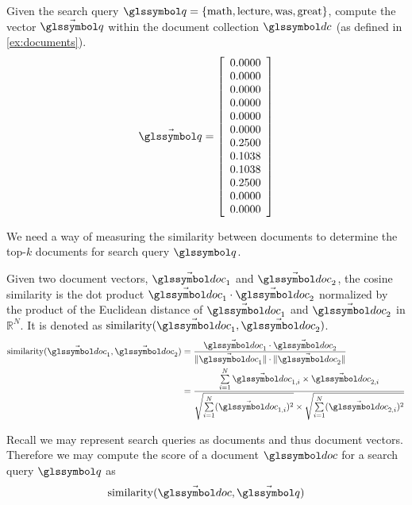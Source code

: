 		\begin{ex}
			\label{ex:query}
			Given the search query \(\q = \{\text{math}, \text{lecture}, \text{was}, \text{great}\}\), compute the vector \(\vec{\q}\) within the document collection \(\dc\) (as defined in \cref{ex:documents}).
			\[
				\vec{\q} = 
					\left[
						\begin{array}{c}
							0.0000 \\
							0.0000 \\
							0.0000 \\
							0.0000 \\
							0.0000 \\
							0.0000 \\
							0.2500 \\
							0.1038 \\
							0.1038 \\
							0.2500 \\
							0.0000 \\
							0.0000 \\
						\end{array}
					\right]
			\]
		\end{ex}
		
		We need a way of measuring the similarity between documents to determine the top-\(k\) documents for search query \(\q\).
		
		\begin{defn}
			Given two document vectors, \(\vec{\doc}_1\) and \(\vec{\doc}_2\), the cosine similarity is the dot product \(\vec{\doc}_1 \cdot \vec{\doc}_2\) normalized by the product of the Euclidean distance of \(\vec{\doc}_1\) and \(\vec{\doc}_2\) in \(\mathbb{R}^N\).	It is denoted as \(\similarity(\vec{\doc}_1, \vec{\doc}_2)\).
			\begin{align}
				\similarity(\vec{\doc}_1, \vec{\doc}_2) &= \frac{\vec{\doc}_1 \cdot \vec{\doc}_2}{\norm{\vec{\doc}_1} \cdot \norm{\vec{\doc}_2}} \\
				 &= \frac{\sum\limits_{i=1}^{N} \vec{\doc}_{1, i} \times \vec{\doc}_{2, i}}{\sqrt{\sum\limits_{i=1}^{N} (\vec{\doc}_{1, i})^2} \times \sqrt{\sum\limits_{i=1}^{N} (\vec{\doc}_{2, i})^2}}
			\end{align}
		\end{defn}
		
		Recall we may represent search queries as documents and thus document vectors.  Therefore we may compute the score of a document \(\doc\) for a search query \(\q\) as
		\[
			\similarity(\vec{\doc}, \vec{\q})
		\]
		
